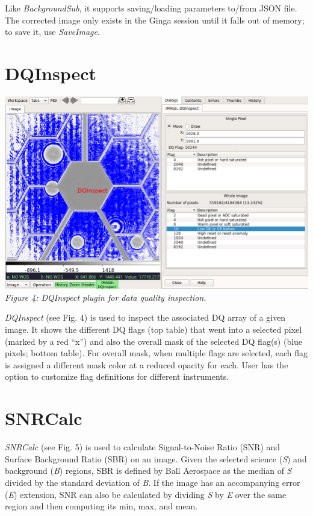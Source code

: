 \documentclass[]{article}
\begin{document}
\begin{multicols}{3}
\para
Like {\em BackgroundSub}, it supports saving/loading parameters to/from
JSON file. The corrected image only exists in the Ginga session until it
falls out of memory; to save it, use {\em SaveImage}.

\section*{DQInspect}

\begin{center}
\includegraphics[width=8in]{plugin_dqinspect} \\
\vspace*{0.4em}
\label{fig:plugin_dqinspect}
{\small\em Figure 4: DQInspect plugin for data quality inspection.}
\end{center}

\para
{\em DQInspect} (see Fig. 4) is used to inspect the associated DQ array of a
given image.
It shows the different DQ flags (top table) that went into a selected pixel
(marked by a red ``x'')
and also the overall mask of the selected DQ flag(s)
(blue pixels; bottom table).
For overall mask, when multiple flags are selected, each flag is assigned a
different mask color at a reduced opacity for each.
User has the option to customize flag definitions for different instruments.

\section*{SNRCalc}

{\em SNRCalc} (see Fig. 5) is used to calculate Signal-to-Noise Ratio (SNR) and
Surface Background Ratio (SBR) on an image.
Given the selected science ({\em S}) and background ({\em B}) regions,
SBR is defined by Ball Aerospace\cite{sbr} as the median of {\em S}
divided by the standard deviation of {\em B}.
If the image has an accompanying error ({\em E}) extension, SNR can also
be calculated by dividing {\em S} by {\em E} over the same region and
then computing its min, max, and mean.


\end{multicols}
\end{document}
